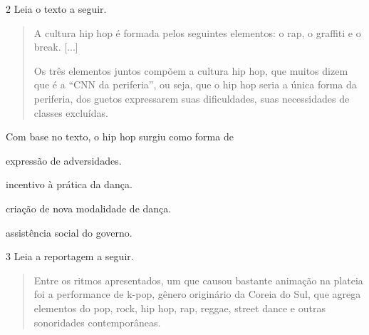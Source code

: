 \num{2} Leia o texto a seguir.

\begin{quote}
A cultura hip hop é formada pelos seguintes elementos: o rap, o graffiti
e o break. {[}...{]}

Os três elementos juntos compõem a cultura hip hop, que muitos dizem que
é a ``CNN da periferia'', ou seja, que o hip hop seria a única forma da
periferia, dos guetos expressarem suas dificuldades, suas necessidades
de classes excluídas.

\end{quote}

Com base no texto, o hip hop surgiu como forma de

\begin{escolha}
\item expressão de adversidades.

\item incentivo à prática da dança.

\item criação de nova modalidade de dança.

\item assistência social do governo.
\end{escolha}



\num{3}  Leia a reportagem a seguir.

\begin{quote}
Entre os ritmos apresentados, um que causou bastante animação na plateia
foi a performance de k-pop, gênero originário da Coreia do Sul, que
agrega elementos do pop, rock, hip hop, rap, reggae, street dance e
outras sonoridades contemporâneas.

\end{quote}


